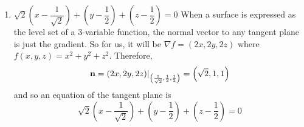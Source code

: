\begin{enumerate}
{\subsection*{3}
We will need to know the normal vector to the tangent plane to understand the reflection angle. Luckily for us, we know that one possible normal vector should just be $\nabla f$, where $f(x,y,z) =x^2+y^2-z$. Thus, $\bn = (2x,2y,-1)$, evaluated at the point $(1,1,2)$ so $\bn = (2,2,-1)$. We also only need the angle of incidence because the law of reflection states it is identical to the angle of reflection. Note that as written, the ray of light points \textit{towards} the paraboloid. So in order to get the correct angle, we need the arrows to point \textit{outwards} from the paraboloid. Therefore the expression we should evaluate is 
\begin{equation*}
    \theta_r = \arccos \frac{\bn \cdot (2,3,-2)}{\|\bn\|\times \|(2,3,-2)\| }=\arccos \frac{12}{3\sqrt{17}} \approx 0.25
\end{equation*}
    }
    \item {}
    {%
        $\sqrt{2}\left( x-\dfrac{1}{\sqrt{2}}\right)+\left(y-\dfrac{1}{2}\right)+\left(z-\dfrac{1}{2}\right)=0$
    }
    {When a surface is expressed as the level set of a 3-variable function, the normal vector to any tangent plane is just the gradient. So for us, it will be $\nabla f = (2x,2y,2z)$ where $f(x,y,z)=x^2+y^2+z^2$. Therefore, 
\begin{equation*}
    \mathbf{n} = (2x,2y,2z)|_{\left(\frac{1}{\sqrt 2},\frac{1}{ 2},\frac{1}{ 2}\right)} = \left(\sqrt{2},1,1\right)
\end{equation*}
and so an equation of the tangent plane is
\begin{equation*}
    \sqrt 2\left(x-\frac{1}{\sqrt 2}\right)+\left(y-\frac{1}{ 2}\right)+\left(z-\frac{1}{ 2}\right)=0
\end{equation*}
}
\end{enumerate} 
